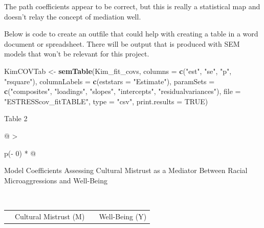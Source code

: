 \documentclass[
  11pt,
]{book}
\newenvironment{Shaded}{\begin{snugshade}}{\end{snugshade}}
\newcommand{\AttributeTok}[1]{\textcolor[rgb]{0.27,0.27,0.27}{#1}}
\newcommand{\ConstantTok}[1]{\textcolor[rgb]{0.37,0.37,0.37}{#1}}
\newcommand{\FunctionTok}[1]{\textcolor[rgb]{0.27,0.27,0.27}{\textbf{#1}}}
\newcommand{\NormalTok}[1]{#1}
\newcommand{\OtherTok}[1]{\textcolor[rgb]{0.37,0.37,0.37}{#1}}
\newcommand{\StringTok}[1]{\textcolor[rgb]{0.5,0.5,0.5}{#1}}
\begin{document}
The path coefficients appear to be correct, but this is really a statistical map and doesn't relay the concept of mediation well.

Below is code to create an outfile that could help with creating a table in a word document or spreadsheet. There will be output that is produced with SEM models that won't be relevant for this project.

\begin{Shaded}
\begin{Highlighting}[]
\NormalTok{KimCOVTab }\OtherTok{\textless{}{-}} \FunctionTok{semTable}\NormalTok{(Kim\_fit\_covs, }\AttributeTok{columns =} \FunctionTok{c}\NormalTok{(}\StringTok{"est"}\NormalTok{, }\StringTok{"se"}\NormalTok{, }\StringTok{"p"}\NormalTok{, }\StringTok{"rsquare"}\NormalTok{),  }\AttributeTok{columnLabels =} \FunctionTok{c}\NormalTok{(}\AttributeTok{eststars =} \StringTok{"Estimate"}\NormalTok{), }\AttributeTok{paramSets =} \FunctionTok{c}\NormalTok{(}\StringTok{"composites"}\NormalTok{, }\StringTok{"loadings"}\NormalTok{, }\StringTok{"slopes"}\NormalTok{, }\StringTok{"intercepts"}\NormalTok{, }\StringTok{"residualvariances"}\NormalTok{), }\AttributeTok{file =} \StringTok{"ESTRESScov\_fitTABLE"}\NormalTok{, }\AttributeTok{type =} \StringTok{"csv"}\NormalTok{, }\AttributeTok{print.results =} \ConstantTok{TRUE}\NormalTok{)}
\end{Highlighting}
\end{Shaded}

Table 2

\begin{longtable}[]{@{}
  >{\raggedright\arraybackslash}p{(\columnwidth - 0\tabcolsep) * }@{}}
\toprule\noalign{}
\begin{minipage}[b]{\linewidth}\raggedright
Model Coefficients Assessing Cultural Mistrust as a Mediator Between Racial Microaggressions and Well-Being
\end{minipage} \\
\midrule\noalign{}
\endhead
\bottomrule\noalign{}
\endlastfoot
\end{longtable}

\begin{longtable}[]{@{}
  >{\raggedright\arraybackslash}p{}
  >{\centering\arraybackslash}p{}
  >{\centering\arraybackslash}p{}
  >{\centering\arraybackslash}p{}@{}}
\toprule\noalign{}
\endhead
\bottomrule\noalign{}
\endlastfoot
& Cultural Mistrust (M) & & Well-Being (Y) \\
\end{longtable}
\end{document}
